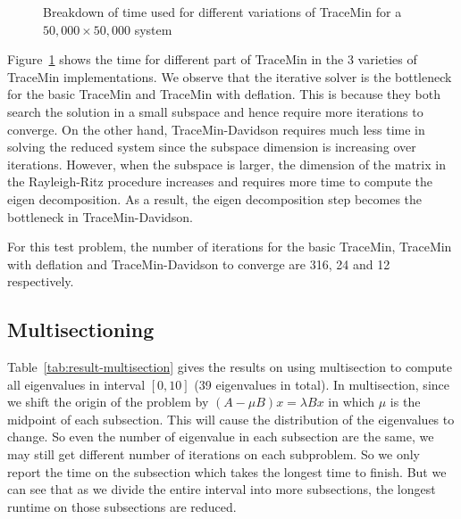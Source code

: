 \begin{figure}[htbp]
	\centering
	\caption{Breakdown of time used for different variations of TraceMin for a $50,000 \times 50,000$ system}
  \label{fig:comp}
\end{figure}

Figure~\ref{fig:comp} shows the time for different part of TraceMin in the 3 varieties of TraceMin implementations.
We observe that the iterative solver is the bottleneck for the basic TraceMin and TraceMin with deflation. This is
because they both search the solution in a small subspace and hence require more iterations to converge. On the
other hand, TraceMin-Davidson requires much less time in solving the reduced system since the subspace dimension is
increasing over iterations. However, when the subspace is larger, the dimension of the matrix in the Rayleigh-Ritz
procedure increases and requires more time to compute the eigen decomposition. As a result, the eigen decomposition
step becomes the bottleneck in TraceMin-Davidson.

For this test problem, the number of iterations for the basic TraceMin, TraceMin with deflation and TraceMin-Davidson
to converge are 316, 24 and 12 respectively.

\subsection{Multisectioning}
Table~\ref{tab:result-multisection} gives the results on using multisection to compute all eigenvalues in interval
$[0, 10]$ (39 eigenvalues in total). In multisection, since we shift the origin of the problem by
$\left(A - \mu B\right) x = \lambda B x$ in which $\mu$ is the midpoint of each subsection. This will cause the
distribution of the eigenvalues to change. So even the number of eigenvalue in each subsection are the same, we may
still get different number of iterations on each subproblem. So we only report the time on the subsection which takes
the longest time to finish. But we can see that as we divide the entire interval into more subsections, the longest
runtime on those subsections are reduced. 

